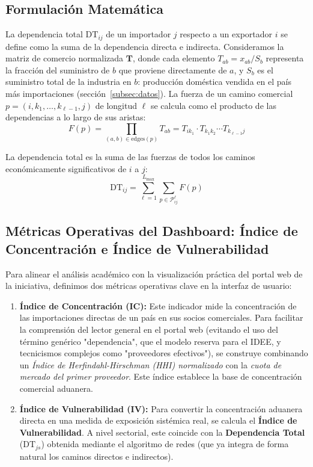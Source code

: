 \documentclass[final,1p,times,authoryear]{elsarticle}
\begin{document}
\subsection{Formulación Matemática}
La dependencia total $\text{DT}_{ij}$ de un importador $j$ respecto a un exportador $i$ se define como la suma de la dependencia directa e indirecta.
Consideramos la matriz de comercio normalizada $\mathbf{T}$, donde cada elemento $T_{ab} = x_{ab} / S_b$ representa la fracción del suministro de $b$ que proviene directamente de $a$, y $S_b$ es el suministro total de la industria en $b$: producción doméstica vendida en el país más importaciones (sección~\ref{subsec:datos}).
La fuerza de un camino comercial $p = (i, k_1, \ldots, k_{\ell-1}, j)$ de longitud $\ell$ se calcula como el producto de las dependencias a lo largo de sus aristas:
\begin{equation}
F(p) = \prod_{(a,b) \in \text{edges}(p)} T_{ab} = T_{ik_1} \cdot T_{k_1k_2} \cdots T_{k_{\ell-1}j}
\end{equation}

La dependencia total es la suma de las fuerzas de todos los caminos económicamente significativos de $i$ a $j$:
\begin{equation}
\text{DT}_{ij} = \sum_{\ell=1}^{L_{\max}} \sum_{p \in \mathcal{P}_{ij}^{\ell}} F(p)
\end{equation}

\subsection{Métricas Operativas del Dashboard: Índice de Concentración e Índice de Vulnerabilidad}

Para alinear el análisis académico con la visualización práctica del portal web de la iniciativa, definimos dos métricas operativas clave en la interfaz de usuario:

\begin{enumerate}
    \item \textbf{Índice de Concentración (IC):} Este indicador mide la concentración de las importaciones directas de un país en sus socios comerciales. Para facilitar la comprensión del lector general en el portal web (evitando el uso del término genérico "dependencia", que el modelo reserva para el IDEE, y tecnicismos complejos como "proveedores efectivos"), se construye combinando un \textit{Índice de Herfindahl-Hirschman (HHI) normalizado} con la \textit{cuota de mercado del primer proveedor}. Este índice establece la base de concentración comercial aduanera.
    
    \item \textbf{Índice de Vulnerabilidad (IV):} Para convertir la concentración aduanera directa en una medida de exposición sistémica real, se calcula el \textbf{Índice de Vulnerabilidad}. A nivel sectorial, este coincide con la \textbf{Dependencia Total} ($\text{DT}_{js}$) obtenida mediante el algoritmo de redes (que ya integra de forma natural los caminos directos e indirectos). 
\end{enumerate}
\end{document}
